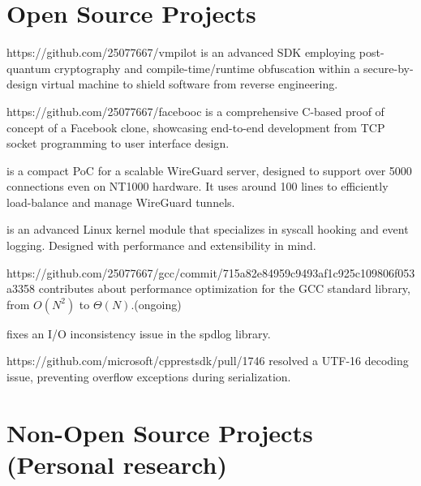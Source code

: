 \section*{Open Source Projects}

\begin{cvitem}
    \item {} {https://github.com/25077667/vmpilot} 
    {is an advanced SDK employing post-quantum cryptography and compile-time/runtime obfuscation
    within a secure-by-design virtual machine to shield software from reverse engineering.}
    \item {} {https://github.com/25077667/facebooc} 
    {is a comprehensive C-based proof of concept of a Facebook clone, showcasing
    end-to-end development from TCP socket programming to user interface design.}
    \item {}
    {is a compact PoC for a scalable WireGuard server, designed to support 
    over 5000 connections even on NT1000 hardware. It uses around 100 lines
    to efficiently load-balance and manage WireGuard tunnels.}
    \item {}
    {is an advanced Linux kernel module that specializes in syscall hooking and event logging. Designed 
    with performance and extensibility in mind.}
    \item {} {https://github.com/25077667/gcc/commit/715a82e84959c9493af1c925c109806f053a3358}
    {contributes about performance optimization for the GCC standard library, from $O(N^2)$ to $\Theta(N)$.(ongoing)}
    \item {}
    {fixes an I/O inconsistency issue in the spdlog library.}
    \item {} {https://github.com/microsoft/cpprestsdk/pull/1746}
    {resolved a UTF-16 decoding issue, preventing overflow exceptions during serialization.}
\end{cvitem}

\section*{Non-Open Source Projects \small{(Personal research)}}

\begin{cvitem}
    \item {}

    \item {}
\end{cvitem}
